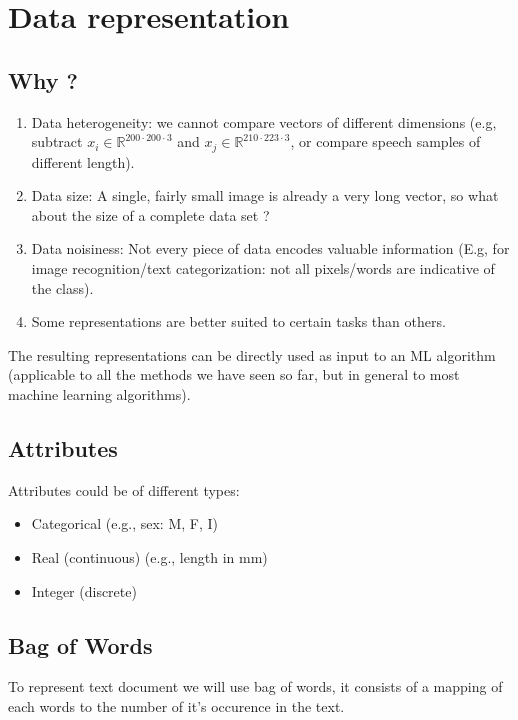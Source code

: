 
\section{Data representation}
\subsection{Why ?}
\begin{enumerate}
\item Data heterogeneity: we cannot compare vectors of different dimensions (e.g, subtract $x_i \in \mathbb{R}^{200 \cdot 200 \cdot 3}$ and $x_j \in \mathbb{R}^{210 \cdot 223 \cdot 3}$, or compare speech samples of different length). 
\item Data size: A single, fairly small image is already a very long vector, so what about the size of a complete data set ?
\item Data noisiness: Not every piece of data encodes valuable information (E.g, for image recognition/text categorization: not all pixels/words are indicative of the class).
\item Some representations are better suited to certain tasks than others.
\end{enumerate}
The resulting representations can be directly used as input to an ML algorithm (applicable to all the methods we have seen so far, but in general to most machine learning algorithms).

\subsection{Attributes}
Attributes could be of different types: 
\begin{itemize}
  \item Categorical (e.g., sex: M, F, I)
  \item Real (continuous) (e.g., length in mm)
  \item Integer (discrete)
\end{itemize}

\subsection{Bag of Words}
To represent text document we will use bag of words, it consists of a mapping of each words to the number of it's occurence in the text.

